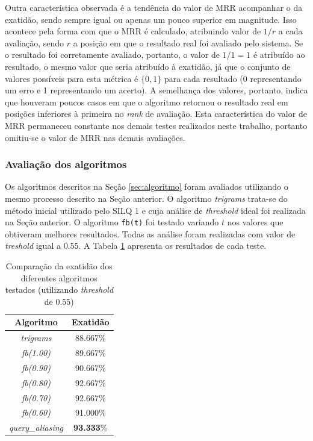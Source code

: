 \documentclass[12pt]{article}
\begin{document}
Outra característica observada é a tendência do valor de MRR acompanhar o da exatidão, sendo sempre igual ou apenas um pouco superior em magnitude. Isso acontece pela forma com que o MRR é calculado, atribuindo valor de $1/r$ a cada avaliação, sendo $r$ a posição em que o resultado real foi avaliado pelo sistema. Se o resultado foi corretamente avaliado, portanto, o valor de $1/1 = 1$ é atribuído ao resultado, o mesmo valor que seria atribuído à exatidão, já que o conjunto de valores possíveis para esta métrica é $\{0, 1\}$ para cada resultado (0 representando um erro e 1 representando um acerto). A semelhança dos valores, portanto, indica que houveram poucos casos em que o algoritmo retornou o resultado real em posições inferiores à primeira no \textit{rank} de avaliação. Esta característica do valor de MRR permaneceu constante nos demais testes realizados neste trabalho, portanto omitiu-se o valor de MRR nas demais avaliações.

\subsubsection{Avaliação dos algoritmos} \label{sec:avaliacao-algoritmos}

Os algoritmos descritos na Seção \ref{sec:algoritmo} foram avaliados utilizando o mesmo processo descrito na Seção anterior. O algoritmo \textit{trigrams} trata-se do método inicial utilizado pelo SILQ 1 e cuja análise de \textit{threshold} ideal foi realizada na Seção anterior. O algoritmo \texttt{fb(t)} foi testado variando $t$ nos valores que obtiveram melhores resultados. Todas as análise foram realizadas com valor de \textit{treshold} igual a $0.55$. A Tabela \ref{tab:comparacao-algoritmos} apresenta os resultados de cada teste.

\begin{table}[!h]
\begin{center}
\caption{Comparação da exatidão dos diferentes algoritmos testados (utilizando \textit{threshold} de $0.55$)}
\label{tab:comparacao-algoritmos}
\begin{tabular}{ c | c }
\hline
\textbf{Algoritmo} & \textbf{Exatidão} \\
\hline

\textit{trigrams} & 88.667\% \\
\textit{fb(1.00)} & 89.667\% \\
\textit{fb(0.90)} & 90.667\% \\
\textit{fb(0.80)} & 92.667\% \\
\textit{fb(0.70)} & 92.667\% \\
\textit{fb(0.60)} & 91.000\% \\
\textit{query\_aliasing} & \textbf{93.333}\% \\

\end{tabular}
\end{center}
\end{table}
\end{document}
